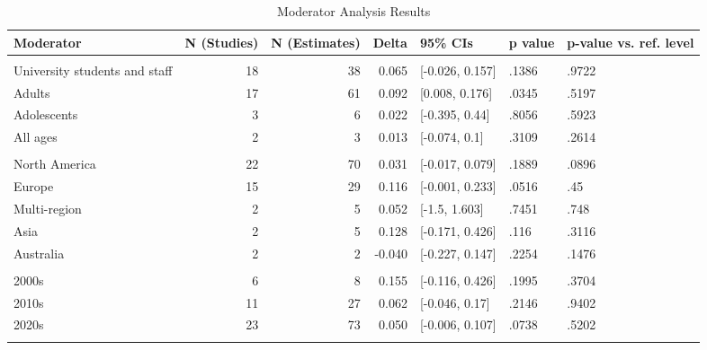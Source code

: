 \documentclass[sn-nature,referee,pdflatex]{sn-jnl}
\begin{document}
\begin{table}

\caption{\label{tab:table_two}Moderator Analysis Results}
\centering
\begin{tabular}[t]{lrrrlll}
\toprule
Moderator & N (Studies) & N (Estimates) & Delta & 95\% CIs & p value & p-value vs. ref. level\\
\midrule
\addlinespace[0.5em]
\multicolumn{7}{l}{\textbf{Population}}\\
\hspace{1em}University students and staff & 18 & 38 & 0.065 & {}[-0.026, 0.157] & .1386 & .9722\\
\hspace{1em}Adults & 17 & 61 & 0.092 & {}[0.008, 0.176] & .0345 & .5197\\
\hspace{1em}Adolescents & 3 & 6 & 0.022 & {}[-0.395, 0.44] & .8056 & .5923\\
\hspace{1em}All ages & 2 & 3 & 0.013 & {}[-0.074, 0.1] & .3109 & .2614\\
\addlinespace[0.5em]
\multicolumn{7}{l}{\textbf{Region}}\\
\hspace{1em}North America & 22 & 70 & 0.031 & {}[-0.017, 0.079] & .1889 & .0896\\
\hspace{1em}Europe & 15 & 29 & 0.116 & {}[-0.001, 0.233] & .0516 & .45\\
\hspace{1em}Multi-region & 2 & 5 & 0.052 & {}[-1.5, 1.603] & .7451 & .748\\
\hspace{1em}Asia & 2 & 5 & 0.128 & {}[-0.171, 0.426] & .116 & .3116\\
\hspace{1em}Australia & 2 & 2 & -0.040 & {}[-0.227, 0.147] & .2254 & .1476\\
\addlinespace[0.5em]
\multicolumn{7}{l}{\textbf{Publication Decade}}\\
\hspace{1em}2000s & 6 & 8 & 0.155 & {}[-0.116, 0.426] & .1995 & .3704\\
\hspace{1em}2010s & 11 & 27 & 0.062 & {}[-0.046, 0.17] & .2146 & .9402\\
\hspace{1em}2020s & 23 & 73 & 0.050 & {}[-0.006, 0.107] & .0738 & .5202\\
\addlinespace[0.5em]
\multicolumn{7}{l}{\textbf{Delivery Methods}}\\

\end{tabular}
\end{table}
\end{document}
